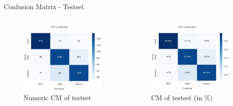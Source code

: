 \documentclass[aspectratio=169]{beamer}
\begin{document}
{	\begin{frame}{Confusion Matrix - Testset}
		\begin{columns}
		\begin{column}{.5\textwidth}
			\begin{figure}
				\centering
				\includegraphics[width=1\textwidth]{img/CFM_trainset_numeric_10.png}
				\caption{Numeric CM of testset}
			\end{figure}      
		\end{column}
		\begin{column}{.5\textwidth}
			\begin{figure}
				\centering
				\includegraphics[width=1\textwidth]{img/CFM_trainset_percent_10.png}
				\caption{CM of testset (in \%)}
			\end{figure}      
		\end{column} 
	\end{columns}
	\end{frame}

}
\end{document}
